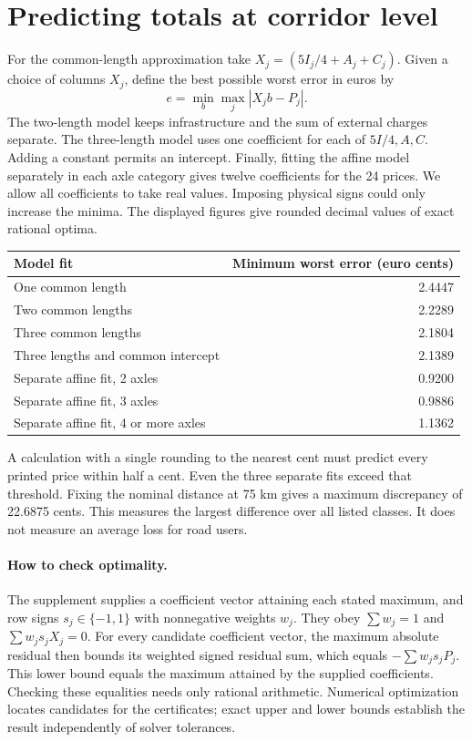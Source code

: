 \documentclass[11pt]{article}
\begin{document}
\section{Predicting totals at corridor level}
For the common-length approximation take $X_j=(5I_j/4+A_j+C_j)$. Given a choice of columns $X_j$, define the best possible worst error in euros by
\[
 e=\min_b\max_j |X_j b-P_j|.
\]
The two-length model keeps infrastructure and the sum of external charges separate. The three-length model uses one coefficient for each of $5I/4,A,C$. Adding a constant permits an intercept. Finally, fitting the affine model separately in each axle category gives twelve coefficients for the 24 prices. We allow all coefficients to take real values. Imposing physical signs could only increase the minima. The displayed figures give rounded decimal values of exact rational optima.

\begin{center}
\begin{tabular}{lr}
\toprule
Model fit & Minimum worst error (euro cents)\\
\midrule
One common length & 2.4447\\
Two common lengths & 2.2289\\
Three common lengths & 2.1804\\
Three lengths and common intercept & 2.1389\\
Separate affine fit, 2 axles & 0.9200\\
Separate affine fit, 3 axles & 0.9886\\
Separate affine fit, 4 or more axles & 1.1362\\
\bottomrule
\end{tabular}
\end{center}

A calculation with a single rounding to the nearest cent must predict every printed price within half a cent. Even the three separate fits exceed that threshold. Fixing the nominal distance at 75 km gives a maximum discrepancy of 22.6875 cents. This measures the largest difference over all listed classes. It does not measure an average loss for road users.

\paragraph{How to check optimality.} The supplement supplies a coefficient vector attaining each stated maximum, and row signs $s_j\in\{-1,1\}$ with nonnegative weights $w_j$. They obey $\sum w_j=1$ and $\sum w_js_jX_j=0$. For every candidate coefficient vector, the maximum absolute residual then bounds its weighted signed residual sum, which equals $-\sum w_js_jP_j$. This lower bound equals the maximum attained by the supplied coefficients. Checking these equalities needs only rational arithmetic. Numerical optimization locates candidates for the certificates; exact upper and lower bounds establish the result independently of solver tolerances.
\end{document}
